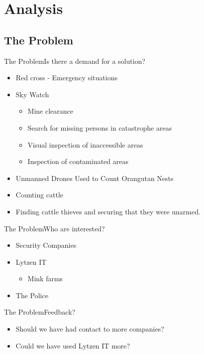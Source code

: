 \author{Bjarke Hesthaven Søndergaard}

\section{Analysis}
\subsection{The Problem}
\begin{frame}{The Problem}{Is there a demand for a solution?}
    \begin{itemize}
        \item Red cross - Emergency situations
        \item Sky Watch
        \begin{itemize}
            \item Mine clearance
            \item Search for missing persons in catastrophe areas
            \item Visual inspection of inaccessible areas
            \item Inspection of contaminated areas
        \end{itemize}
        \item Unmanned Drones Used to Count Orangutan Nests
        \item Counting cattle
        \item Finding cattle thieves and securing that they were unarmed.
    \end{itemize}
\end{frame}

\begin{frame}{The Problem}{Who are interested?}
    \begin{itemize}
        \item Security Companies
        \item Lytzen IT
        \begin{itemize}
            \item Mink farms
        \end{itemize}
        \item The Police
    \end{itemize}
\end{frame}

\begin{frame}{The Problem}{Feedback?}
    \begin{itemize}
        \item Should we have had contact to more companies?
        \item Could we have used Lytzen IT more?
    \end{itemize}
\end{frame}

